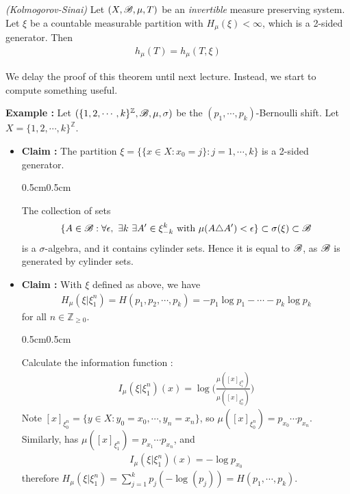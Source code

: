\documentclass[12pt,a4paper]{report}
\newenvironment{subproof}
{\begin{changemargin}{0.5cm}{0.5cm}
	}%
	{\end{changemargin}
}
\begin{document}
\thm \emph{(Kolmogorov-Sinai)} Let $(X,\mathscr{B}, \mu, T)$ be an \emph{invertible} measure preserving system. Let $\xi$ be a countable measurable partition with $H_{\mu}(\xi) < \infty$, which is a 2-sided generator. Then
\begin{align*}
h_{\mu}(T) = h_{\mu}(T,\xi)
\end{align*}
\s

We delay the proof of this theorem until next lecture. Instead, we start to compute something useful.
\s

\textbf{Example :} Let $(\{1,2,\cdots, k\}^{\mathbb{Z}}, \mathscr{B}, \mu, \sigma)$ be the $(p_1, \cdots, p_k)$-Bernoulli shift. Let $X =\{1,2,\cdots, k\}^{\mathbb{Z}}$.
\begin{itemize}
\item \textbf{Claim :} The partition $\xi = \{ \{x\in X: x_0 =j \} : j=1, \cdots, k \}$ is a 2-sided generator.
\begin{subproof}
\pf The collection of sets
\begin{align*}
\{ A\in \mathscr{B} : \forall \epsilon, \,\, \exists k \,\, \exists A' \in \xi^{k}_{-k} \text{ with } \mu(A\triangle A') < \epsilon \} \subset \sigma(\xi) \subset \mathscr{B}
\end{align*}
is a $\sigma$-algebra, and it contains cylinder sets. Hence it is equal to $\mathscr{B}$, as $\mathscr{B}$ is generated by cylinder sets.

\eop
\end{subproof}
\s

\item \textbf{Claim :} With $\xi$ defined as above, we have 
\begin{align*}
H_{\mu}(\xi | \xi_{1}^n) = H(p_1, p_2, \cdots, p_k) = -p_1 \log p_1 -\cdots -p_k \log p_k
\end{align*}
for all $n \in \mathbb{Z}_{\geq 0}$.
\begin{subproof}
\pf Calculate the information function : 
\begin{align*}
I_{\mu}(\xi | \xi_1^n) (x)  = \log \Big( \frac{\mu([x]_{\xi_1^n})}{\mu([x]_{\xi_0^n})} \Big)
\end{align*}
Note $[x]_{\xi_0^n} = \{y\in X : y_0=x_0, \cdots, y_n =x_n \}$, so $\mu([x]_{\xi_0^n}) = p_{x_0}\cdots p_{x_n}$. Similarly, has $\mu([x]_{\xi_1^n})=p_{x_1} \cdots p_{x_n}$, and
\begin{align*}
I_{\mu}(\xi|\xi_1^n) (x) = - \log p_{x_0} 
\end{align*}
therefore $H_{\mu} (\xi |\xi_1^n) = \sum_{j=1}^{k} p_j (-\log (p_j)) = H(p_1, \cdots, p_k)$. 


\end{subproof}
\end{itemize}
\end{document}
